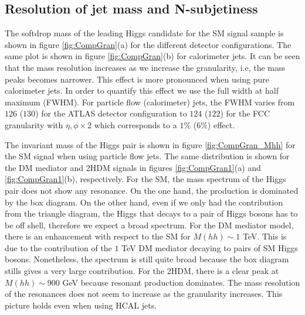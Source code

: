 \subsection{Resolution of jet mass and N-subjetiness}
\label{sec:res}

The softdrop mass of the leading Higgs candidate for the SM signal sample is shown in figure \ref{fig:CompGran}(a) for the different detector configurations. The same plot is shown in figure \ref{fig:CompGran}(b) for calorimeter jets. It can be seen that the mass resolution increases as we increase the granularity, i.e, the mass peaks becomes narrower. This effect is more pronounced when using pure calorimeter jets. In order to quantify this effect we use the full width at half maximum (FWHM). For particle flow (calorimeter) jets, the FWHM varies from $126$ ($130$) for the ATLAS detector configuration to $124$ ($122$) for the FCC granularity with $\eta,\phi\times 2$ which corresponds to a $1\%$ ($6\%$) effect.

The invariant mass of the Higgs pair is shown in figure \ref{fig:CompGran_Mhh} for the SM signal when using particle flow jets. The same distribution is shown for the DM mediator and 2HDM signals in figures \ref{fig:CompGran1}(a) and \ref{fig:CompGran1}(b), respectively. For the SM, the mass spectrum of the Higgs pair does not show any resonance. On the one hand, the production is dominated by the box diagram. On the other hand, even if we only had the contribution from the triangle diagram, the Higgs that decays to a pair of Higgs bosons has to be off shell, therefore we expect a broad spectrum. For the DM mediator model, there is an enhancement with respect to the SM for $M(hh)\sim 1$ TeV. This is due to the contribution of the $1$ TeV DM mediator decaying to pairs of SM Higgs bosons. Nonetheless, the spectrum is still quite broad because the box diagram stills gives a very large contribution. For the 2HDM, there is a clear peak at $M(hh)\sim 900$ GeV because resonant production dominates. The mass resolution of the resonances does not seem to increase as the granularity increases. This picture holds even when using HCAL jets.

